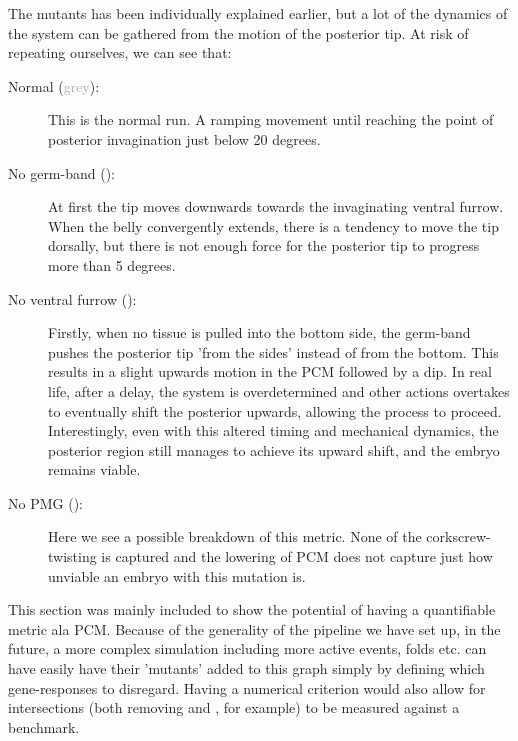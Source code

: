 \begin{figure}[H]
    \label{fig:PCM-mutants}
\end{figure}


The mutants has been individually explained earlier, but a lot of the dynamics of the system can be gathered from the motion of the posterior tip. At risk of repeating ourselves, we can see that:\\
\begin{description}
    \item[Normal (\textcolor{darkgray}{grey}):] This is the normal run. A ramping movement until reaching the point of posterior invagination just below 20 degrees. 
    \item[No germ-band ():] At first the tip moves downwards towards the invaginating ventral furrow. When the belly convergently extends, there is a tendency to move the tip dorsally, but there is not enough force for the posterior tip to progress more than 5 degrees. 
    \item[No ventral furrow ():] Firstly, when no tissue is pulled into the bottom side, the germ-band pushes the posterior tip 'from the sides' instead of from the bottom. This results in a slight upwards motion in the PCM followed by a dip. In real life, after a delay, the system is overdetermined and other actions overtakes to eventually shift the posterior upwards, allowing the process to proceed. Interestingly, even with this altered timing and mechanical dynamics, the posterior region still manages to achieve its upward shift, and the embryo remains viable. 
    \item[No PMG ():]  Here we see a possible breakdown of this metric. None of the corkscrew-twisting is captured and the lowering of PCM does not capture just how unviable an embryo with this mutation is.  
\end{description}

This section was mainly included to show the potential of having a quantifiable metric ala PCM. Because of the generality of the pipeline we have set up, in the future, a more complex simulation including more active events, folds etc. can have easily have their 'mutants' added to this graph simply by defining which gene-responses to disregard. Having a numerical criterion would also allow for intersections (both removing  and , for example) to be measured against a benchmark.


